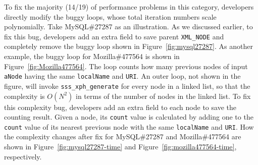 To fix the majority (14/19) of performance problems in this category,
developers directly modify the buggy loops, 
whose total iteration numbers scale polynomially.
Take MySQL\#27287 as an illustration.
As we discussed earlier, to fix this bug,
developers add an extra field to save parent \texttt{XML\_NODE}
and completely remove the buggy loop shown in Figure~\ref{fig:mysql27287}.
As another example, the buggy loop for Mozilla\#477564 is shown in Figure~\ref{fig:Mozilla477564}.
The loop counts how many previous nodes of input \texttt{aNode} 
having the same \texttt{localName} and \texttt{URI}.
An outer loop, not shown in the figure, 
will invoke \texttt{sss\_xph\_generate} for every node in a linked list, 
so that the complexity is $O(N^2)$ in terms of the number of nodes in the linked list.
To fix this complexity bug, developers add an extra field to each node to 
save the counting result. 
Given a node, 
its \texttt{count} value is calculated by adding one 
to the \texttt{count} value of 
its nearest previous node with the same \texttt{localName} and \texttt{URI}.  
How the complexity changes after fix for MySQL\#27287 and Mozilla\#477564 are 
shown in Figure~\ref{fig:mysql27287-time} and Figure~\ref{fig:mozilla477564-time}, respectively. 









